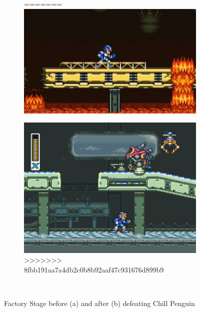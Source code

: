 \begin{figure}[h]
\begin{subfigure}{0.465\textwidth}
=======
		\includegraphics[width=\linewidth]{figures/X1/Flame_fire.jpg}
		\caption{}
	\end{subfigure}
	\begin{subfigure}{0.49\textwidth}
		\centering
		\includegraphics[width=\linewidth]{figures/X1/Flame_frozen.jpg}
>>>>>>> 8fbb191aa7a4db2c0b8b92aaf47c931676d899b9
		\caption{}
	\end{subfigure}\\
	\caption{Factory Stage before (a) and after (b)  defeating Chill Penguin}
\end{figure}

